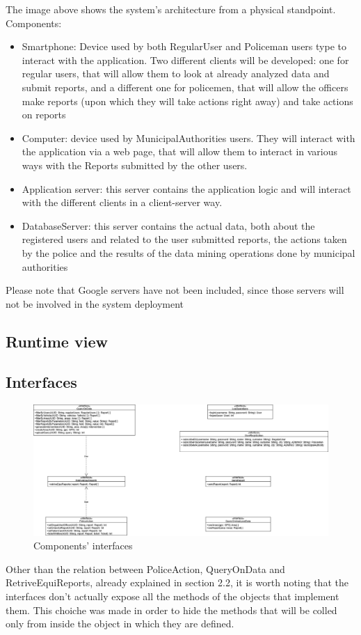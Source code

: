 The image above shows the system's architecture from a physical standpoint.
Components:
\begin{itemize}
\item Smartphone: Device used by both RegularUser and Policeman users type to interact with the application. Two different clients will be developed: one for regular users, that will allow them to look at already analyzed data and submit reports, and a different one for policemen, that will allow the officers make reports (upon which they will take actions right away) and take actions on reports
\item Computer: device used by MunicipalAuthorities users. They will interact with the application via a web page, that will allow them to interact in various ways with the Reports submitted by the other users.
\item Application server: this server contains the application logic and will interact with the different clients in a client-server way.
\item DatabaseServer: this server contains the actual data, both about the registered users and related to the user submitted reports, the actions taken by the police and the results of the data mining operations done by municipal authorities
\end{itemize}
Please note that Google servers have not been included, since those servers will not be involved in the system deployment
\newpage
\subsection{Runtime view}
\newpage
\subsection{Interfaces}
\begin{figure}[h!]
	\centering
	\includegraphics[width=\textwidth]{Images/interface_diagram}
	\caption{Components' interfaces}
\end{figure}
Other than the relation between PoliceAction, QueryOnData and RetriveEquiReports, already explained in section 2.2, it is worth noting that the interfaces don't actually expose all the methods of the objects that implement them. This choiche was made in order to hide the methods that will be colled only from inside the object in which they are defined.
\newpage 
